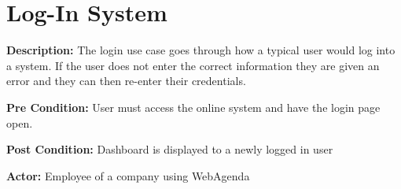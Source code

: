 \documentclass[letterpaper,12pt]{report}
\begin{document}
\section{Log-In System}

\begin{description}
 \item \textbf{Description:} \newline The login use case goes through how a typical user would log into a system. If the user does not enter the correct information they are given an error and they can then re-enter their credentials.
 \item \textbf{Pre Condition:} \newline User must access the online system and have the login page open.
 \item \textbf{Post Condition:} \newline Dashboard is displayed to a newly logged in user
 \item \textbf{Actor:} \newline Employee of a company using WebAgenda
\end{description}
\end{document}
